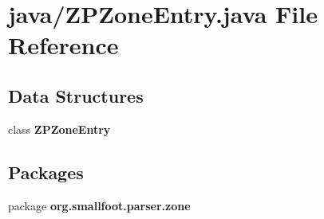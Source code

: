 \section{java/\-Z\-P\-Zone\-Entry.java File Reference}
\label{ZPZoneEntry_8java}
\subsection*{Data Structures}
\begin{DoxyCompactItemize}
\item 
class {\bfseries Z\-P\-Zone\-Entry}
\end{DoxyCompactItemize}
\subsection*{Packages}
\begin{DoxyCompactItemize}
\item 
package {\bf org.\-smallfoot.\-parser.\-zone}
\end{DoxyCompactItemize}
